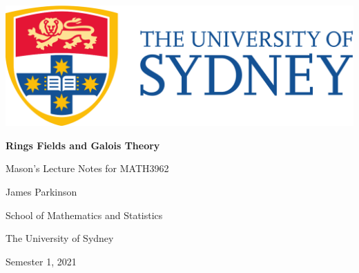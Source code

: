 \documentclass[12pt, a4paper]{report}
\begin{document}
\pagestyle{1-1}
\thispagestyle{empty}
\setcounter{secnumdepth}{0}
\includegraphics[scale=0.1]{./UsydLogo}

\vspace{1cm}


\horline
{\centering\bfseries \Large Rings Fields and Galois Theory

}
\horline

\vspace{3cm}

{\large \centering Mason's Lecture Notes for \textsc{MATH3962}

}

{\centering

\vspace{1cm}

James Parkinson

\vspace{1cm}

School of Mathematics and Statistics

The University of Sydney

\vfill

Semester 1, 2021\newpage

}
\tableofcontents


\end{document}
